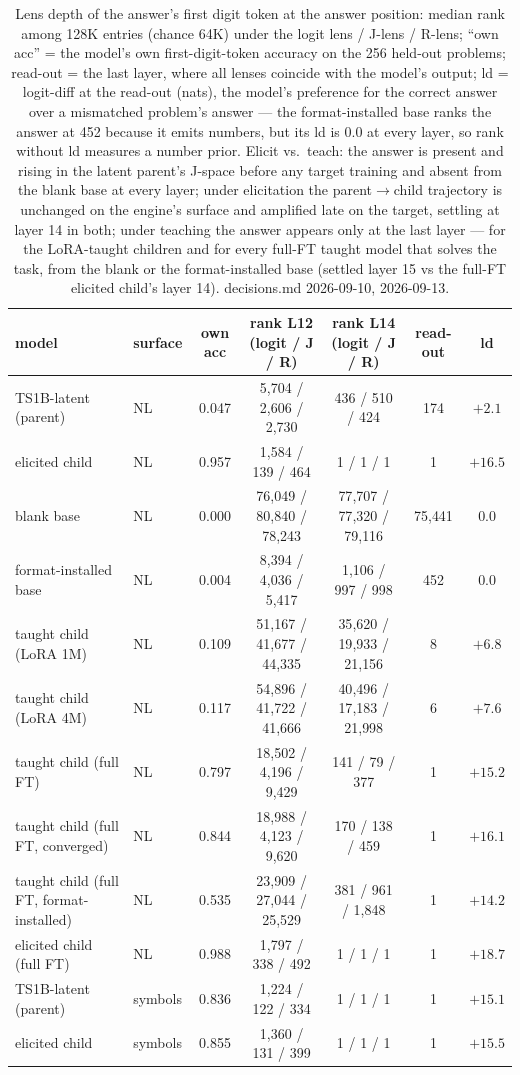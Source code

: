 \begin{table}[t]
\centering
\begin{tabular}{llccccc}
\hline
model & surface & own acc & rank L12 (logit / J / R) & rank L14 (logit / J / R) & read-out & ld \\
\hline
TS1B-latent (parent) & NL & 0.047 & 5{,}704 / 2{,}606 / 2{,}730 & 436 / 510 / 424 & 174 & $+2.1$ \\
elicited child & NL & 0.957 & 1{,}584 / 139 / 464 & 1 / 1 / 1 & 1 & $+16.5$ \\
blank base & NL & 0.000 & 76{,}049 / 80{,}840 / 78{,}243 & 77{,}707 / 77{,}320 / 79{,}116 & 75{,}441 & $0.0$ \\
format-installed base & NL & 0.004 & 8{,}394 / 4{,}036 / 5{,}417 & 1{,}106 / 997 / 998 & 452 & $0.0$ \\
taught child (LoRA 1M) & NL & 0.109 & 51{,}167 / 41{,}677 / 44{,}335 & 35{,}620 / 19{,}933 / 21{,}156 & 8 & $+6.8$ \\
taught child (LoRA 4M) & NL & 0.117 & 54{,}896 / 41{,}722 / 41{,}666 & 40{,}496 / 17{,}183 / 21{,}998 & 6 & $+7.6$ \\
taught child (full FT) & NL & 0.797 & 18{,}502 / 4{,}196 / 9{,}429 & 141 / 79 / 377 & 1 & $+15.2$ \\
taught child (full FT, converged) & NL & 0.844 & 18{,}988 / 4{,}123 / 9{,}620 & 170 / 138 / 459 & 1 & $+16.1$ \\
taught child (full FT, format-installed) & NL & 0.535 & 23{,}909 / 27{,}044 / 25{,}529 & 381 / 961 / 1{,}848 & 1 & $+14.2$ \\
elicited child (full FT) & NL & 0.988 & 1{,}797 / 338 / 492 & 1 / 1 / 1 & 1 & $+18.7$ \\
TS1B-latent (parent) & symbols & 0.836 & 1{,}224 / 122 / 334 & 1 / 1 / 1 & 1 & $+15.1$ \\
elicited child & symbols & 0.855 & 1{,}360 / 131 / 399 & 1 / 1 / 1 & 1 & $+15.5$ \\
\hline
\end{tabular}
\caption{Lens depth of the answer's first digit token at the answer position: median rank among 128K entries (chance 64K) under the logit lens / J-lens / R-lens; ``own acc'' = the model's own first-digit-token accuracy on the 256 held-out problems; read-out = the last layer, where all lenses coincide with the model's output; ld = logit-diff at the read-out (nats), the model's preference for the correct answer over a mismatched problem's answer --- the format-installed base ranks the answer at 452 because it emits numbers, but its ld is 0.0 at every layer, so rank without ld measures a number prior. Elicit vs.\ teach: the answer is present and rising in the latent parent's J-space before any target training and absent from the blank base at every layer; under elicitation the parent$\to$child trajectory is unchanged on the engine's surface and amplified late on the target, settling at layer 14 in both; under teaching the answer appears only at the last layer --- for the LoRA-taught children and for every full-FT taught model that solves the task, from the blank or the format-installed base (settled layer 15 vs the full-FT elicited child's layer 14). decisions.md 2026-09-10, 2026-09-13.}
\label{tab:lens_depth}
\end{table}
